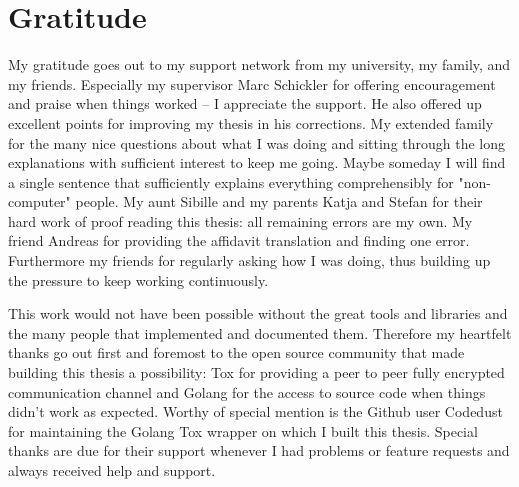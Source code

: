 \section*{Gratitude}
\label{chap:gratitude}

My gratitude goes out to my support network from my university, my family, and my friends.
Especially my supervisor Marc Schickler for offering encouragement and praise when things worked -- I appreciate the support.
He also offered up excellent points for improving my thesis in his corrections.
My extended family for the many nice questions about what I was doing and sitting through the long explanations with sufficient interest to keep me going.
Maybe someday I will find a single sentence that sufficiently explains everything comprehensibly for "non-computer" people.
My aunt Sibille and my parents Katja and Stefan for their hard work of proof reading this thesis: all remaining errors are my own.
My friend Andreas for providing the affidavit translation and finding one error.
Furthermore my friends for regularly asking how I was doing, thus building up the pressure to keep working continuously.

This work would not have been possible without the great tools and libraries and the many people that implemented and documented them.
Therefore my heartfelt thanks go out first and foremost to the open source community that made building this thesis a possibility: Tox for providing a peer to peer fully encrypted communication channel and Golang for the access to source code when things didn't work as expected.
Worthy of special mention is the Github user Codedust for maintaining the Golang Tox wrapper on which I built this thesis.
Special thanks are due for their support whenever I had problems or feature requests and always received help and support.
